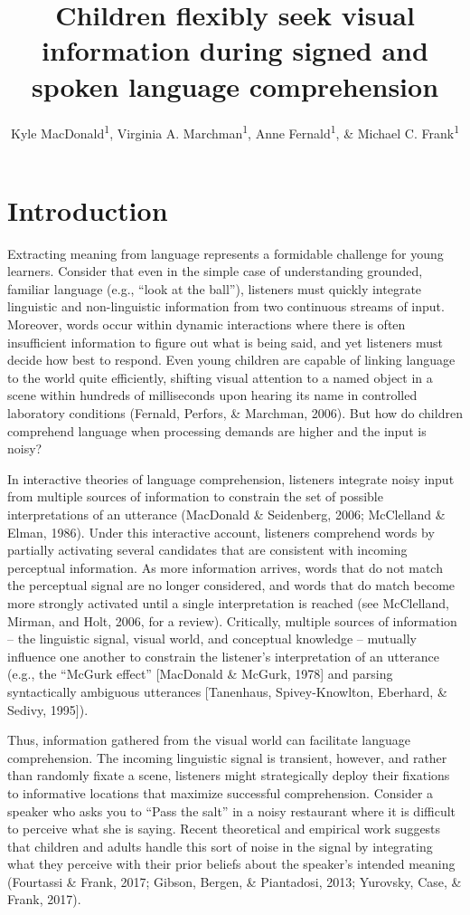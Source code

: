 \documentclass[,man,floatsintext]{apa6}
\title{Children flexibly seek visual information during signed and spoken
language comprehension}
\author{Kyle MacDonald\textsuperscript{1}, Virginia A.
Marchman\textsuperscript{1}, Anne Fernald\textsuperscript{1}, \& Michael
C. Frank\textsuperscript{1}}
\date{}
\affiliation{
\vspace{0.5cm}
\textsuperscript{1} Stanford University}
\begin{document}
\maketitle

\hypertarget{introduction}{%
\section{Introduction}\label{introduction}}

Extracting meaning from language represents a formidable challenge for
young learners. Consider that even in the simple case of understanding
grounded, familiar language (e.g., \enquote{look at the ball}),
listeners must quickly integrate linguistic and non-linguistic
information from two continuous streams of input. Moreover, words occur
within dynamic interactions where there is often insufficient
information to figure out what is being said, and yet listeners must
decide how best to respond. Even young children are capable of linking
language to the world quite efficiently, shifting visual attention to a
named object in a scene within hundreds of milliseconds upon hearing its
name in controlled laboratory conditions (Fernald, Perfors, \& Marchman,
2006). But how do children comprehend language when processing demands
are higher and the input is noisy?

In interactive theories of language comprehension, listeners integrate
noisy input from multiple sources of information to constrain the set of
possible interpretations of an utterance (MacDonald \& Seidenberg, 2006;
McClelland \& Elman, 1986). Under this interactive account, listeners
comprehend words by partially activating several candidates that are
consistent with incoming perceptual information. As more information
arrives, words that do not match the perceptual signal are no longer
considered, and words that do match become more strongly activated until
a single interpretation is reached (see McClelland, Mirman, and Holt,
2006, for a review). Critically, multiple sources of information -- the
linguistic signal, visual world, and conceptual knowledge -- mutually
influence one another to constrain the listener's interpretation of an
utterance (e.g., the \enquote{McGurk effect} {[}MacDonald \& McGurk,
1978{]} and parsing syntactically ambiguous utterances {[}Tanenhaus,
Spivey-Knowlton, Eberhard, \& Sedivy, 1995{]}).

Thus, information gathered from the visual world can facilitate language
comprehension. The incoming linguistic signal is transient, however, and
rather than randomly fixate a scene, listeners might strategically
deploy their fixations to informative locations that maximize successful
comprehension. Consider a speaker who asks you to \enquote{Pass the
salt} in a noisy restaurant where it is difficult to perceive what she
is saying. Recent theoretical and empirical work suggests that children
and adults handle this sort of noise in the signal by integrating what
they perceive with their prior beliefs about the speaker's intended
meaning (Fourtassi \& Frank, 2017; Gibson, Bergen, \& Piantadosi, 2013;
Yurovsky, Case, \& Frank, 2017).
\end{document}
